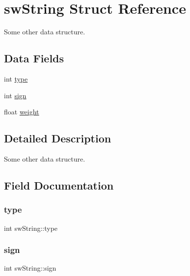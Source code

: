 \hypertarget{structsw_string}{}\section{sw\+String Struct Reference}
\label{structsw_string}


Some other data structure.  


\subsection*{Data Fields}
\begin{DoxyCompactItemize}
\item 
int \mbox{\hyperlink{structsw_string_addebb11cfebe93604a0ee3ac05e743ad}{type}}
\item 
int \mbox{\hyperlink{structsw_string_a6a55abcf6f7a4f0b4f8a01e0fd9a2d02}{sign}}
\item 
float \mbox{\hyperlink{structsw_string_a59272a18126fcf037501e0c80982949a}{weight}}
\end{DoxyCompactItemize}


\subsection{Detailed Description}
Some other data structure. 

\subsection{Field Documentation}
\mbox{\label{structsw_string_addebb11cfebe93604a0ee3ac05e743ad}} 
\subsubsection{\texorpdfstring{type}{type}}
{\footnotesize\ttfamily int sw\+String\+::type}

\mbox{\label{structsw_string_a6a55abcf6f7a4f0b4f8a01e0fd9a2d02}} 
\subsubsection{\texorpdfstring{sign}{sign}}
{\footnotesize\ttfamily int sw\+String\+::sign}

